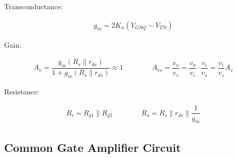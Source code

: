 Transconductance:

\begin{equation*}
  \begin{aligned}
    g_m = 2 K_n \left( V_{GSQ} - V_{TN} \right)
  \end{aligned}
\end{equation*}

Gain:

\begin{equation*}
  \begin{aligned}
    A_v = \dfrac{g_m \left( R_s \parallel r_{ds} \right)}{1 + g_m \left( R_s \parallel r_{ds} \right)} \approx 1 \quad\quad \quad\quad 
    A_{vs} = \dfrac{v_o}{v_s} = \dfrac{v_o}{v_i} \cdot \dfrac{v_i}{v_s} = \dfrac{v_i}{v_s} A_v
  \end{aligned}
\end{equation*}

Resistance:

\begin{equation*}
  \begin{aligned}
    R_i = R_{g1} \parallel R_{g2} \quad\quad \quad\quad 
    R_o = R_s \parallel r_{ds} \parallel \dfrac{1}{g_m} 
  \end{aligned}
\end{equation*}

\subsection{Common Gate Amplifier Circuit}

